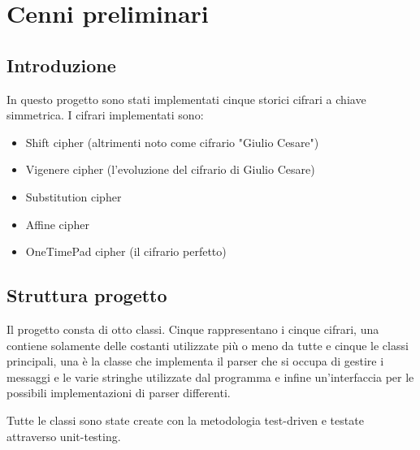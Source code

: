 \chapter{Cenni preliminari}

	\section{Introduzione}
		In questo progetto sono stati implementati cinque storici cifrari a chiave simmetrica. I cifrari implementati sono:
		\begin{itemize}
			\item Shift cipher (altrimenti noto come cifrario "Giulio Cesare")
			\item Vigenere cipher (l'evoluzione del cifrario di Giulio Cesare)
			\item Substitution cipher
			\item Affine cipher
			\item OneTimePad cipher (il cifrario perfetto)
		\end{itemize}
		
	\section{Struttura progetto}
		Il progetto consta di otto classi. Cinque rappresentano i cinque cifrari, una contiene solamente delle costanti utilizzate più o meno da tutte e cinque le classi principali, una è la classe che implementa il parser che si occupa di gestire i messaggi e le varie stringhe utilizzate dal programma e infine un'interfaccia per le possibili implementazioni di parser differenti.
		
		Tutte le classi sono state create con la metodologia test-driven e testate attraverso unit-testing.